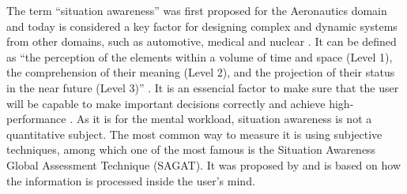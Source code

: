 
%

The term “situation awareness” was first proposed for the Aeronautics domain and today is considered a key factor for designing complex and dynamic systems from other domains, such as automotive, medical and nuclear \cite{endsley1995measurement}. It can be defined as “the perception of the elements within a volume of time and space (Level 1), the comprehension of their meaning (Level 2), and the projection of their status in the near future (Level 3)” \cite{sanders1998human}. It is an essencial factor to make sure that the user will be capable to make important decisions correctly and achieve high-performance \cite{endsley1988design, endsley2018automation}. As it is for the mental workload, situation awareness is not a quantitative subject. The most common way to measure it is using subjective techniques, among which one of the most famous is the Situation Awareness Global Assessment Technique (SAGAT). It was proposed by \cite{endsley1988design} and is based on how the information is processed inside the user’s mind.

